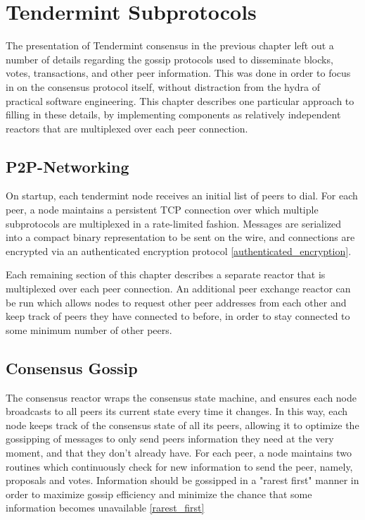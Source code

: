 \chapter{Tendermint Subprotocols}
\label{ch:subprotocols}

The presentation of Tendermint consensus in the previous chapter left out a number of details
regarding the gossip protocols used to disseminate blocks, votes, transactions, 
and other peer information. 
This was done in order to focus in on the consensus protocol itself, 
without distraction from the hydra of practical software engineering.
This chapter describes one particular approach to filling in these details,
by implementing components as relatively independent reactors that are multiplexed over each peer connection.

\section{P2P-Networking}

On startup, each tendermint node receives an initial list of peers to dial.
For each peer, a node maintains a persistent TCP connection over which multiple subprotocols are multiplexed in a rate-limited fashion.
Messages are serialized into a compact binary representation to be sent on the wire, and 
connections are encrypted via an authenticated encryption protocol \ref{authenticated_encryption}.

Each remaining section of this chapter describes a separate reactor that is multiplexed over each peer connection.
An additional peer exchange reactor can be run which allows nodes to request other peer addresses from each other and keep track of peers they have connected to before,
in order to stay connected to some minimum number of other peers.

\section{Consensus Gossip}

The consensus reactor wraps the consensus state machine, 
and ensures each node broadcasts to all peers its current state every time it changes.
In this way, each node keeps track of the consensus state of all its peers, 
allowing it to optimize the gossipping of messages to only send peers information they need at the very moment,
and that they don't already have.
For each peer, a node maintains two routines which continuously check for new information to send the peer,
namely, proposals and votes. 
Information should be gossipped in a "rarest first" manner in order to maximize 
gossip efficiency and minimize the chance that some information becomes unavailable \ref{rarest_first}


